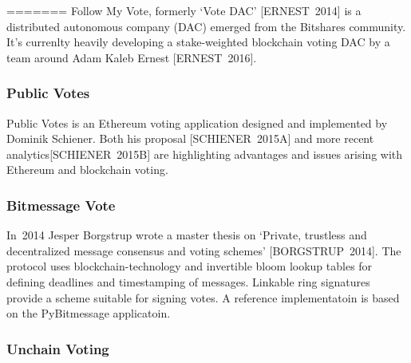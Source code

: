 \documentclass[9pt,oneside]{amsart}
\begin{document}
\begin{multicols}{2}
=======
Follow My Vote, formerly \enquote*{Vote DAC} [ERNEST~2014] is a distributed autonomous company (DAC) emerged from the Bitshares community. It's currenlty heavily developing a stake-weighted blockchain voting DAC by a team around Adam Kaleb Ernest [ERNEST~2016].

\subsubsection{Public Votes}
Public Votes is an Ethereum voting application designed and implemented by Dominik Schiener. Both his proposal [SCHIENER~2015A] and more recent analytics[SCHIENER~2015B] are highlighting advantages and issues arising with Ethereum and blockchain voting.

\subsubsection{Bitmessage Vote}
In~2014 Jesper Borgstrup wrote a master thesis on \enquote*{Private, trustless and decentralized message consensus and voting schemes} [BORGSTRUP~2014]. The protocol uses blockchain-technology and invertible bloom lookup tables for defining deadlines and timestamping of messages. Linkable ring signatures provide a scheme suitable for signing votes. A reference implementatoin is based on the PyBitmessage applicatoin.

\subsubsection{Unchain Voting}


\end{multicols}
\end{document}
